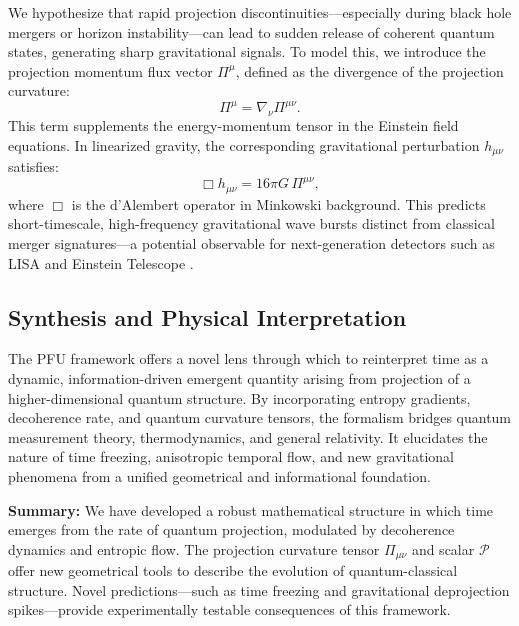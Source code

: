 \documentclass[12pt,a4paper]{article}
\numberwithin{equation}{section}
\begin{document}
We hypothesize that rapid projection discontinuities—especially during black hole mergers or horizon instability—can lead to sudden release of coherent quantum states, generating sharp gravitational signals. To model this, we introduce the projection momentum flux vector $\Pi^\mu$, defined as the divergence of the projection curvature:
\begin{equation}
\label{eq:proj_flux}
\Pi^\mu = \nabla_\nu \Pi^{\mu\nu}.
\end{equation}
This term supplements the energy-momentum tensor in the Einstein field equations. In linearized gravity, the corresponding gravitational perturbation $h_{\mu\nu}$ satisfies:
\begin{equation}
\label{eq:gw_proj}
\Box h_{\mu\nu} = 16 \pi G \, \Pi^{\mu\nu},
\end{equation}
where $\Box$ is the d’Alembert operator in Minkowski background. This predicts short-timescale, high-frequency gravitational wave bursts distinct from classical merger signatures—a potential observable for next-generation detectors such as LISA and Einstein Telescope \cite{abbott_gw150914_2016, sesana_lisa_2016}.

\subsection{Synthesis and Physical Interpretation}

The PFU framework offers a novel lens through which to reinterpret time as a dynamic, information-driven emergent quantity arising from projection of a higher-dimensional quantum structure. By incorporating entropy gradients, decoherence rate, and quantum curvature tensors, the formalism bridges quantum measurement theory, thermodynamics, and general relativity. It elucidates the nature of time freezing, anisotropic temporal flow, and new gravitational phenomena from a unified geometrical and informational foundation.

\vspace{0.5cm}
\noindent\textbf{Summary:} We have developed a robust mathematical structure in which time emerges from the rate of quantum projection, modulated by decoherence dynamics and entropic flow. The projection curvature tensor $\Pi_{\mu\nu}$ and scalar $\mathcal{P}$ offer new geometrical tools to describe the evolution of quantum-classical structure. Novel predictions—such as time freezing and gravitational deprojection spikes—provide experimentally testable consequences of this framework.
\end{document}
